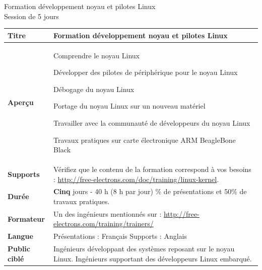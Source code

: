 \documentclass[a4paper,12pt,obeyspaces,spaces,hyphens]{article}
\begin{document}
\thispagestyle{fancy}

\setlength{\arrayrulewidth}{0.8pt}

\begin{center}
\LARGE
Formation développement noyau et pilotes Linux\\
\large
Session de 5 jours
\end{center}
\vspace{1cm}

\small
{}

 {
  \begin{tabularx}{\textwidth}{|g|h|}
    {\bf Titre} & {\bf Formation développement noyau et pilotes Linux} \\
    \hline

    {\bf Aperçu} &
    Comprendre le noyau Linux \par
    Développer des pilotes de périphérique pour le noyau Linux \par
    Débogage du noyau Linux \par
    Portage du noyau Linux sur un nouveau matériel \par
    Travailler avec la communauté de développeurs du noyau Linux \par
    Travaux pratiques sur carte électronique ARM BeagleBone Black \\
    \hline
    {\bf Supports} &
    Vérifiez que le contenu de la formation correspond à vos besoins :
    \newline \url{http://free-electrons.com/doc/training/linux-kernel}. \\
    \hline

    {\bf Durée} & {\bf Cinq} jours - 40 h (8 h par jour)
    \% de présentations et 50\% de travaux pratiques. \\
    \hline

    {\bf Formateur} & Un des ingénieurs mentionnés sur :
    \newline \url{http://free-electrons.com/training/trainers/}\\
    \hline

    {\bf Langue} & Présentations : Français
    \newline Supports : Anglais\\
    \hline

    {\bf Public ciblé} & Ingénieurs développant des systèmes reposant sur le noyau Linux.
    \newline Ingénieurs supportant des développeurs Linux embarqué.\\
    \hline


\end{tabularx}}
\end{document}
